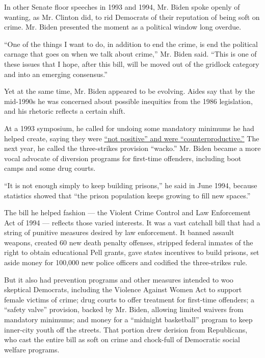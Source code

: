 In other Senate floor speeches in 1993 and 1994, Mr. Biden spoke openly
of wanting, as Mr. Clinton did, to rid Democrats of their reputation of
being soft on crime. Mr. Biden presented the moment as a political
window long overdue.

``One of the things I want to do, in addition to end the crime, is end
the political carnage that goes on when we talk about crime,'' Mr. Biden
said. ``This is one of these issues that I hope, after this bill, will
be moved out of the gridlock category and into an emerging consensus.''

Yet at the same time, Mr. Biden appeared to be evolving. Aides say that
by the mid-1990s he was concerned about possible inequities from the
1986 legislation, and his rhetoric reflects a certain shift.

At a 1993 symposium, he called for undoing some mandatory minimums he
had helped create, saying they were
\href{https://books.google.com/books?id=i4Z4D5V-kD0C\&pg=PA74\&lpg=PA74\&dq=\%22I+think+we\%E2\%80\%99ve+had+all+the+mandatory+minimums+that+we+need.+We+don\%E2\%80\%99t+need+the+ones+that+we+have.\%22\&source=bl\&ots=t65CfOWL2Y\&sig=P8TEZNgAD-Ma5jcVPbaB8beL-t0\&hl=en\&sa=X\&ved=0CB4Q6AEwAGoVChMIvpim-4LFxwIVh3YeCh2mKwZW\#v=onepage\&q\&f=false}{``not
positive'' and were ``counterproductive.''} The next year, he called the
three-strikes provision ``wacko.'' Mr. Biden became a more vocal
advocate of diversion programs for first-time offenders, including boot
camps and some drug courts.

``It is not enough simply to keep building prisons,'' he said in June
1994, because statistics showed that ``the prison population keeps
growing to fill new spaces.''

The bill he helped fashion --- the Violent Crime Control and Law
Enforcement Act of 1994 --- reflects those varied interests. It was a
vast catchall bill that had a string of punitive measures desired by law
enforcement. It banned assault weapons, created 60 new death penalty
offenses, stripped federal inmates of the right to obtain educational
Pell grants, gave states incentives to build prisons, set aside money
for 100,000 new police officers and codified the three-strikes rule.

But it also had prevention programs and other measures intended to woo
skeptical Democrats, including the Violence Against Women Act to support
female victims of crime; drug courts to offer treatment for first-time
offenders; a ``safety valve'' provision, backed by Mr. Biden, allowing
limited waivers from mandatory minimums; and money for a ``midnight
basketball'' program to keep inner-city youth off the streets. That
portion drew derision from Republicans, who cast the entire bill as soft
on crime and chock-full of Democratic social welfare programs.

